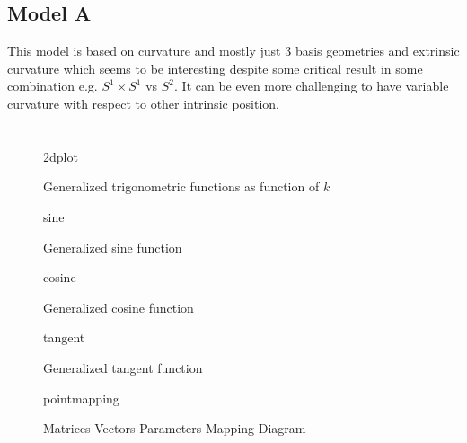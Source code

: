 \documentclass[stu, babel, american, biblatex, a4paper, draftall]{apa7}
\newcommand{\insertstandalone}[2]{{#2}}
\newcommand{\insertstandalone}[2]{\texttt{[image: \#1/\#2.pdf]}}
\begin{document}
\subsection{Model A}
This model is based on curvature and mostly just 3 basis geometries and extrinsic curvature which seems to be interesting despite some critical result in some combination e.g. $S^1 \times S^1$ vs $S^2$. It can be even more challenging to have variable curvature with respect to other intrinsic position.
\section*{}
\printbibliography
\begin{figure}
    \centering
    \insertstandalone{figures}{2dplot}
    \caption{Generalized trigonometric functions as function of $k$}\label{TrigonometryPlotted}
\end{figure}
\begin{figure}
    \centering
    \insertstandalone{figures}{sine}
    \caption{Generalized sine function}\label{TrigonometrySinePlotted}
\end{figure}
\begin{figure}
    \centering
    \insertstandalone{figures}{cosine}
    \caption{Generalized cosine function}\label{TrigonometryCosinePlotted}
\end{figure}
\begin{figure}
    \centering
    \insertstandalone{figures}{tangent}
    \caption{Generalized tangent function}\label{TrigonometryTangentPlotted}
\end{figure}
\begin{figure}
    \centering
    \insertstandalone{figures}{pointmapping}
    \caption{Matrices-Vectors-Parameters Mapping Diagram}\label{PointMappingDiagram}
\end{figure}
\end{document}

